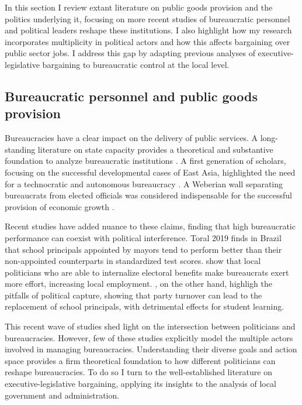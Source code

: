 In this section I review extant literature on public goods provision and the politics underlying it, focusing on more recent studies of bureaucratic personnel and political leaders reshape these institutions. I also highlight how my research incorporates multiplicity in political actors and how this affects bargaining over public sector jobs. I address this gap by adapting previous analyses of executive-legislative bargaining to bureaucratic control at the local level.

\subsection*{Bureaucratic personnel and public goods provision}

Bureaucracies have a clear impact on the delivery of public services. A long-standing literature on state capacity provides a theoretical and substantive foundation to analyze bureaucratic institutions \citep{centeno_unpacking_2017, kohli_state-directed_2004}. A first generation of scholars, focusing on the successful developmental cases of East Asia, highlighted the need for a technocratic and autonomous bureaucracy \citep{johnson_miti_1982, kohli_state-directed_2004}. A Weberian wall separating bureaucrats from elected officials was considered indispensable for the successful provision of economic growth \citep{evans_bureaucracy_1999}.

Recent studies have added nuance to these claims, finding that high bureaucratic performance can coexist with political interference. Toral 2019 finds in Brazil that school principals appointed by mayors tend to perform better than their non-appointed counterparts in standardized test scores. \citet{gulzar_politicians_2017} show that local politicians who are able to internalize electoral benefits make bureaucrats exert more effort, increasing local employment. \citet{akhtari_political_2015}, on the other hand, highligh the pitfalls of political capture, showing that party turnover can lead to the replacement of school principals, with detrimental effects for student learning.

This recent wave of studies shed light on the intersection between politicians and bureaucracies. However, few of these studies explicitly model the multiple actors involved in managing bureaucracies. Understanding their diverse goals and action space provides a firm theoretical foundation to how different politicians can reshape bureaucracies. To do so I turn to the well-established literature on executive-legislative bargaining, applying its insights to the analysis of local government and administration.

